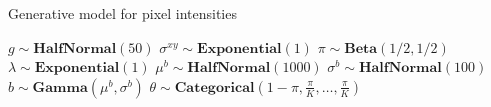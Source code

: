 \begin{algorithm}
\caption{Generative model for pixel intensities}
\label{alg:pseudocode}
\begin{algorithmic}[1]
\State $g \sim \mathbf{HalfNormal}(50)$
\State $\sigma^{xy} \sim \mathbf{Exponential}(1)$
\State $\pi \sim \mathbf{Beta}(1/2, 1/2)$
\State $\lambda \sim \mathbf{Exponential}(1)$
    \State $\mu^b \sim \mathbf{HalfNormal}(1000)$
    \State $\sigma^b \sim \mathbf{HalfNormal}(100)$
        \State $b \sim \mathbf{Gamma}(\mu^b, \sigma^b)$
        \State $\theta \sim \mathbf{Categorical}\left(1 - \pi, \frac{\pi}{K}, \dots, \frac{\pi}{K}\right)$
        

\end{algorithmic}
\end{algorithm}
